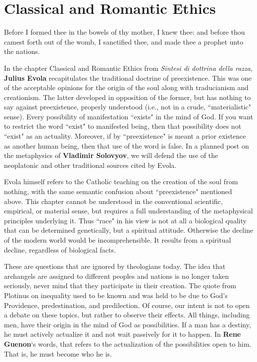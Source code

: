 \section{Classical and Romantic Ethics}

\begin{quotex}
Before I formed thee in the bowels of thy mother, I knew thee: and before thou camest forth out of the womb, I sanctified thee, and made thee a prophet unto the nations. 

\end{quotex}
In the chapter Classical and Romantic Ethics from \textit{Sintesi di dottrina della razza}, \textbf{Julius Evola} recapitulates the traditional doctrine of preexistence. This was one of the acceptable opinions for the origin of the soul along with traducianism and creationism. The latter developed in opposition of the former, but has nothing to say against preexistence, properly understood (i.e., not in a crude, ``materialistic" sense). Every possibility of manifestation ``exists" in the mind of God. If you want to restrict the word ``exist" to manifested being, then that possibility does not ``exist" as an actuality. Moreover, if by ``preexistence" is meant a prior existence as another human being, then that use of the word is false. In a planned post on the metaphysics of \textbf{Vladimir Solovyov}, we will defend the use of the neoplatonic and other traditional sources cited by Evola.

Evola himself refers to the Catholic teaching on the creation of the soul from nothing, with the same semantic confusion about ``preexistence" mentioned above. This chapter cannot be understood in the conventional scientific, empirical, or material sense, but requires a full understanding of the metaphysical principles underlying it. Thus ``race" in his view is not at all a biological quality that can be determined genetically, but a spiritual attitude. Otherwise the decline of the modern world would be incomprehensible. It results from a spiritual decline, regardless of biological facts.

These are questions that are ignored by theologians today. The idea that archangels are assigned to different peoples and nations is no longer taken seriously, never mind that they participate in their creation. The quote from Plotinus on inequality used to be known and was held to be due to God's Providence, predestination, and predilection. Of course, our intent is not to open a debate on these topics, but rather to observe their effects. All things, including men, have their origin in the mind of God as possibilities. If a man has a destiny, he must actively actualize it and not wait passively for it to happen. In \textbf{Rene Guenon}`s words, that refers to the actualization of the possibilities open to him. That is, he must become who he is.


